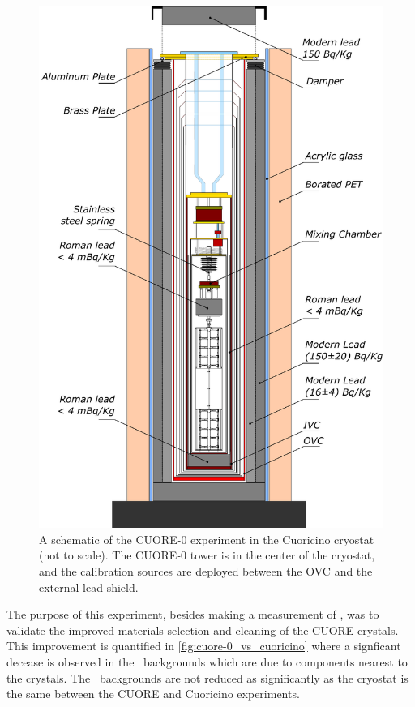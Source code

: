 \begin{figure} [htbp]
    \centering
    \includegraphics[width=0.8\linewidth]{Figures/CUORE-0_cryostat_schematic.pdf}
    \caption[A schematic of the CUORE-0 experiment.]
    {A schematic of the CUORE-0 experiment in the Cuoricino cryostat (not to scale).
    The CUORE-0 tower is in the center of the cryostat, and the calibration sources are deployed between the OVC and the external lead shield.}
    \label{fig:CUORE-0_cryostat_schematic}
\end{figure}

The purpose of this experiment, besides  making a measurement of \zeronubb, was to validate the improved materials selection and cleaning of the CUORE crystals.
This improvement is quantified in \autoref{fig:cuore-0_vs_cuoricino} where a signficant decease is observed in the \alpha~backgrounds which are due to components nearest to the crystals.
The \gamma~backgrounds are not reduced as significantly as the cryostat is the same between the CUORE and Cuoricino experiments.

